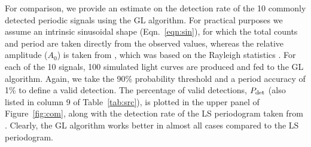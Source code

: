 \documentclass[fleqn,usenatbib]{mnras}
\begin{document}
For comparison, we provide an estimate on the detection rate of the 10 commonly detected periodic signals using the GL algorithm. For practical purposes we assume an intrinsic sinusoidal shape (Eqn.~\ref{eqn:sin}), for which the total counts and period are taken directly from the observed values, whereas the relative amplitude ($A_0$) is taken 
from \citet{2012ApJ...746..165H}, which was  based on the Rayleigh statistics \citep{1983A&A...128..245B,2003ApJ...599..465M}. 
For each of the 10 signals, 100 simulated light curves are produced and fed to the GL algorithm.
Again, we take the 90\% probability threshold and a period accuracy of 1\% to define a valid detection. The percentage of valid detections, $P_{\rm det}$ (also listed in column 9 of Table~\ref{tab:src}), is plotted in the upper panel of Figure~\ref{fig:com}, along with the detection rate of the LS periodogram taken from \citet{2012ApJ...746..165H}.
Clearly, the GL algorithm works better in almost all cases compared to the LS periodogram. 
\end{document}
